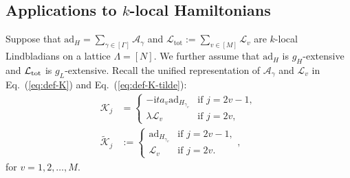 \documentclass[aps,pra,reprint,groupedaddress,floatfix]{revtex4-2}
\newcommand{\eq}[1]{(\ref{eq:#1})}
\renewcommand{\i}{\mathrm{i}}
\renewcommand{\L}{\mathcal{L}}
\newcommand{\ad}{\mathrm{ad}}
\newcommand{\A}{\mathcal{A}}
\newcommand{\tot}{\mathrm{tot}}
\newcommand{\mc}{\mathcal}
\begin{document}
\subsection{Applications to $k$-local Hamiltonians}
\label{sec:local}
Suppose that $\ad_H=\sum_{\gamma\in[\Gamma]}\A_\gamma$ and $\mc L_{\tot}:=\sum_{v\in [M]}\mc L_v$ are $k$-local Lindbladians on a lattice $\Lambda = [N]$. We further assume that $\ad_H$ is $g_H$-extensive and $\L_{\rm tot}$ is $g_L$-extensive.
Recall the unified representation of $\mc A_{\gamma}$ and $\mc L_v$ in Eq.~\eq{def-K} and Eq.~\eq{def-K-tilde}: \begin{align*}
    \mathcal{K}_j
    &=
    \begin{cases}
        -\i ta_{v}\ad_{H_{\gamma_v}} & \text{if } j = 2v-1, \\
        \lambda\mathcal{L}_v & \text{if } j = 2v,
    \end{cases} \\
    \tilde{\mathcal{K}}_j
    &:=
    \begin{cases}
        \ad_{H_{\gamma_v}} & \text{if } j = 2v-1,\\
        \mathcal{L}_v & \text{if } j = 2v.
    \end{cases},
\end{align*}
for $v=1, 2,\ldots, M$.  
\end{document}
